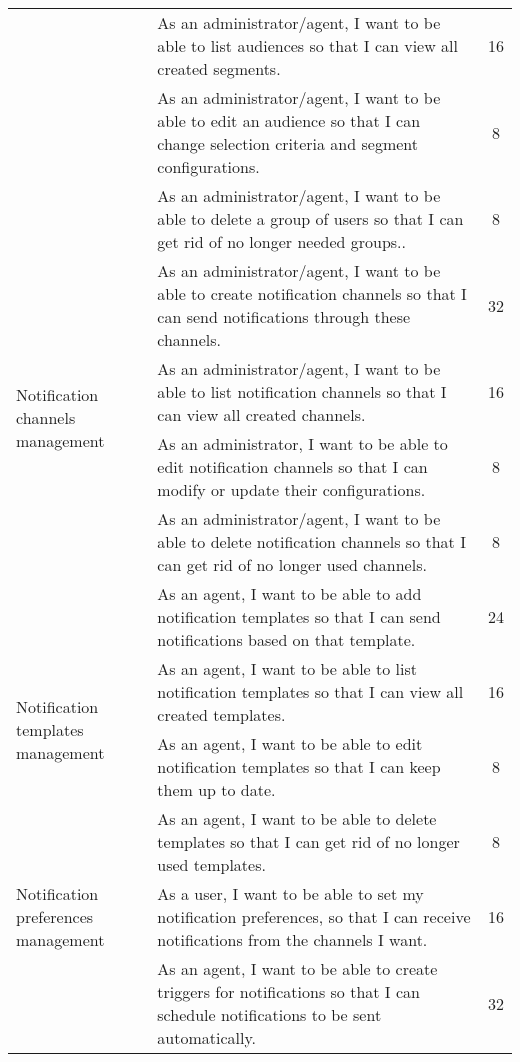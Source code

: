 \begin{longtable}{ | m{}  | m{} | c | }
        & As an administrator/agent, I want to be able to list audiences so that I can view all created segments. & 16 \\
        \cline{2-3}
        & As an administrator/agent, I want to be able to edit an audience so that I can change selection criteria and segment configurations. & 8 \\
        \cline{2-3}
        & As an administrator/agent, I want to be able to delete a group of users so that I can get rid of no longer needed groups.. & 8 \\
        \hline
        \multirow{4}{5em}{Notification channels management} & As an administrator/agent, I want to be able to create notification channels so that I can send notifications through these channels. & 32 \\
        \cline{2-3}
        & As an administrator/agent, I want to be able to list notification channels so that I can view all created channels. & 16 \\
        \cline{2-3}
        & As an administrator, I want to be able to edit notification channels so that I can modify or update their configurations. & 8 \\
        \cline{2-3}
        & As an administrator/agent, I want to be able to delete notification channels so that I can get rid of no longer used channels. & 8 \\
        \hline
        \multirow{4}{5em}{Notification templates management} & As an agent, I want to be able to add notification templates so that I can send notifications based on that template. & 24 \\
        \cline{2-3}
        & As an agent, I want to be able to list notification templates so that I can view all created templates. & 16 \\
        \cline{2-3}
        & As an agent, I want to be able to edit notification templates so that I can keep them up to date. & 8 \\
        \cline{2-3}
        & As an agent, I want to be able to delete templates so that I can get rid of no longer used templates. & 8 \\
        \hline
        Notification preferences management & As a user, I want to be able to set my notification preferences, so that I can receive notifications from the channels I want. & 16 \\
        \hline
        \pagebreak
        \multirow{4}{5em}{Notification triggers management} & As an agent, I want to be able to create triggers for notifications so that I can schedule notifications to be sent automatically. & 32 \\

\end{longtable}
